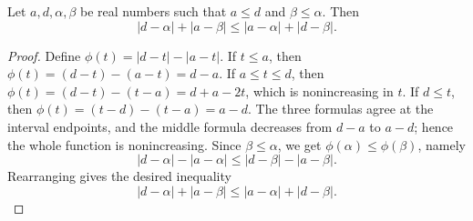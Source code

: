 \begin{helper}
Let \(a, d, \alpha, \beta\) be real numbers such that \(a \le d\) and \(\beta \le \alpha\). Then
\[
|d - \alpha| + |a - \beta| \le |a - \alpha| + |d - \beta|.
\]
\end{helper}
\begin{proof}
Define \(\phi(t) = |d - t| - |a - t|\).
If \(t \le a\), then \(\phi(t) = (d - t) - (a - t) = d - a\).
If \(a \le t \le d\), then \(\phi(t) = (d - t) - (t - a) = d + a - 2t\), which is nonincreasing in \(t\).
If \(d \le t\), then \(\phi(t) = (t - d) - (t - a) = a - d\).
The three formulas agree at the interval endpoints, and the middle formula decreases from \(d - a\) to \(a - d\); hence the whole function is nonincreasing.
Since \(\beta \le \alpha\), we get \(\phi(\alpha) \le \phi(\beta)\), namely
\[
|d - \alpha| - |a - \alpha| \le |d - \beta| - |a - \beta|.
\]
Rearranging gives the desired inequality
\[
|d - \alpha| + |a - \beta| \le |a - \alpha| + |d - \beta|.
\]
\end{proof}
